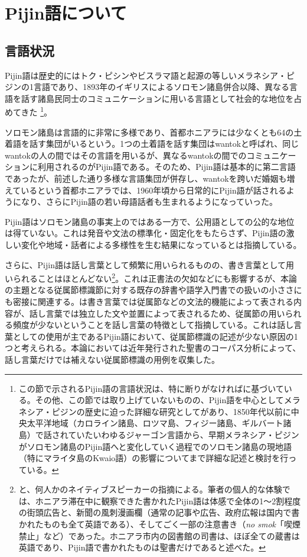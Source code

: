 \section{Pijin語について}
\subsection{言語状況}
Pijin語は歴史的にはトク・ピシンやビスラマ語と起源の等しいメラネシア・ピジンの1言語であり、1893年のイギリスによるソロモン諸島併合以降、異なる言語を話す諸島民同士のコミュニケーションに用いる言語として社会的な地位を占めてきた
\footnote{
この節で示されるPijin語の言語状況は、特に断りがなければ\cite{phonology}に基づいている。その他、この節では取り上げていないものの、Pijin語を中心としてメラネシア・ピジンの歴史に迫った詳細な研究として\cite{keesing}があり、1850年代以前に中央太平洋地域（カロライン諸島、ロツマ島、フィジー諸島、ギルバート諸島）で話されていたいわゆるジャーゴン言語から、早期メラネシア・ピジンがソロモン諸島のPijin語へと変化していく過程でのソロモン諸島の現地語（特にマライタ島のKwaio語）の影響についてまで詳細な記述と検討を行っている。}。

ソロモン諸島は言語的に非常に多様であり、首都ホニアラには少なくとも64の土着語を話す集団がいるという\citep{nativization}。1つの土着語を話す集団はwantokと呼ばれ、同じwantokの人の間ではその言語を用いるが、異なるwantokの間でのコミュニケーションに利用されるのがPijin語である。そのため、Pijin語は基本的に第二言語であったが、前述した通り多様な言語集団が併存し、wantokを跨いだ婚姻も増えているという首都ホニアラでは、1960年頃から日常的にPijin語が話されるようになり、さらにPijin語の若い母語話者も生まれるようになっていった。

Pijin語はソロモン諸島の事実上のではある一方で、公用語としての公的な地位は得ていない。これは発音や文法の標準化・固定化をもたらさず、Pijin語の激しい変化や地域・話者による多様性を生む結果になっていると\cite{phonology}は指摘している。

さらに、Pijin語は話し言葉として頻繁に用いられるものの、書き言葉として用いられることはほとんどない\footnote{
\cite{phonology}と、何人かのネイティブスピーカーの指摘による。筆者の個人的な体験では、ホニアラ滞在中に観察できた書かれたPijin語は体感で全体の1～2割程度の街頭広告と、新聞の風刺漫画欄（通常の記事や広告、政府広報は国内で書かれたものも全て英語である）、そしてごく一部の注意書き（\textit{no smok}「喫煙禁止」など）であった。ホニアラ市内の図書館の司書は、ほぼ全ての蔵書は英語であり、Pijin語で書かれたものは聖書だけであると述べた。}。これは正書法の欠如などにも影響するが、本論の主題となる従属節標識節に対する既存の辞書や語学入門書での扱いの小ささにも密接に関連する。\cite{chafe}は書き言葉では従属節などの文法的機能によって表される内容が、話し言葉では独立した文や並置によって表されるため、従属節の用いられる頻度が少ないということを話し言葉の特徴として指摘している。これは話し言葉としての使用が主であるPijin語において、従属節標識の記述が少ない原因の1つと考えられる。本論においては近年発行された聖書のコーパス分析によって、話し言葉だけでは補えない従属節標識の用例を収集した。

